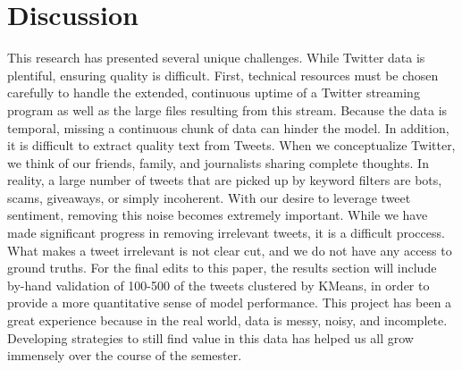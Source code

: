 \documentclass[sigconf]{acmart}
\begin{document}
\section{Discussion}

This research has presented several unique challenges. While Twitter data is plentiful, ensuring quality is difficult. First, technical resources must be chosen carefully to handle the extended, continuous uptime of a Twitter streaming program as well as the large files resulting from this stream. Because the data is temporal, missing a continuous chunk of data can hinder the model. In addition, it is difficult to extract quality text from Tweets. When we conceptualize Twitter, we think of our friends, family, and journalists sharing complete thoughts. In reality, a large number of tweets that are picked up by keyword filters are bots, scams, giveaways, or simply incoherent. With our desire to leverage tweet sentiment, removing this noise becomes extremely important. While we have made significant progress in removing irrelevant tweets, it is a difficult proccess. What makes a tweet irrelevant is not clear cut, and we do not have any access to ground truths. For the final edits to this paper, the results section will include by-hand validation of 100-500 of the tweets clustered by KMeans, in order to provide a more quantitative sense of model performance. This project has been a great experience because in the real world, data is messy, noisy, and incomplete. Developing strategies to still find value in this data has helped us all grow immensely over the course of the semester.



\end{document}
